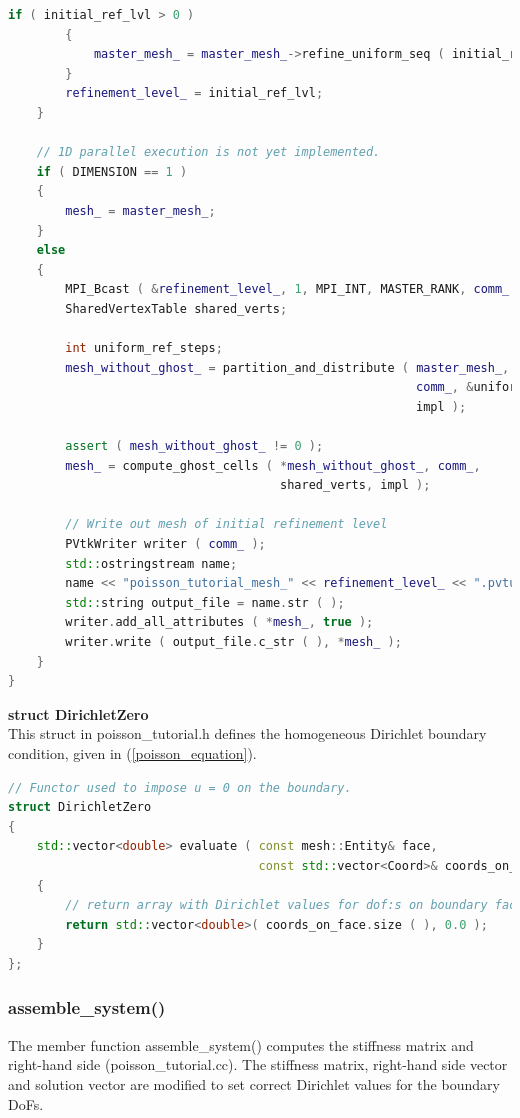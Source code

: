 \documentclass[a4paper, 11pt, twoside]{article}
\begin{document}
\begin{lstlisting}[language=C++, basicstyle={\footnotesize, \ttfamily}, keywordstyle=\color{blue}, numbers=none, tabsize=4]
        if ( initial_ref_lvl > 0 )
        {
            master_mesh_ = master_mesh_->refine_uniform_seq ( initial_ref_lvl );
        }
        refinement_level_ = initial_ref_lvl;
    }

    // 1D parallel execution is not yet implemented.
    if ( DIMENSION == 1 )
    {
        mesh_ = master_mesh_;
    }
    else
    {
        MPI_Bcast ( &refinement_level_, 1, MPI_INT, MASTER_RANK, comm_ );
        SharedVertexTable shared_verts;

        int uniform_ref_steps;
        mesh_without_ghost_ = partition_and_distribute ( master_mesh_, MASTER_RANK, 
                                                         comm_, &uniform_ref_steps, 
                                                         impl );

        assert ( mesh_without_ghost_ != 0 );
        mesh_ = compute_ghost_cells ( *mesh_without_ghost_, comm_, 
                                      shared_verts, impl );

        // Write out mesh of initial refinement level      
        PVtkWriter writer ( comm_ );
        std::ostringstream name;
        name << "poisson_tutorial_mesh_" << refinement_level_ << ".pvtu";
        std::string output_file = name.str ( );
        writer.add_all_attributes ( *mesh_, true );
        writer.write ( output_file.c_str ( ), *mesh_ );
    }
}
\end{lstlisting}

\textbf{struct DirichletZero} \label{structDirichletZero}\\
This struct in poisson\_tutorial.h defines the homogeneous Dirichlet boundary condition, given in (\ref{poisson_equation}).
\begin{lstlisting}[language=C++, basicstyle={\footnotesize, \ttfamily}, keywordstyle=\color{blue}, numbers=none, tabsize=4]
// Functor used to impose u = 0 on the boundary.
struct DirichletZero
{
    std::vector<double> evaluate ( const mesh::Entity& face,
                                   const std::vector<Coord>& coords_on_face ) const
    {
        // return array with Dirichlet values for dof:s on boundary face
        return std::vector<double>( coords_on_face.size ( ), 0.0 );
    }
};
\end{lstlisting}

\subsubsection{assemble\_system()}
The member function assemble\_system() computes the stiffness matrix and right-hand side (poisson\_tutorial.cc). The stiffness matrix, right-hand side vector and solution vector are modified to set correct Dirichlet values for the boundary DoFs.
\end{document}
